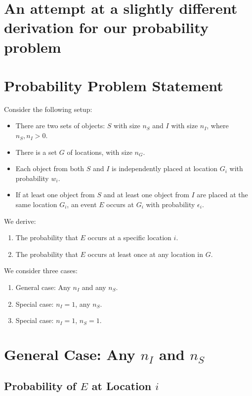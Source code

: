 \documentclass[11pt]{article}
\begin{document}
\section{An attempt at a slightly different derivation for our probability problem}

\section{Probability Problem Statement}

Consider the following setup:
\begin{itemize}
    \item There are two sets of objects: $ S $ with size $ n_S $ and $ I $ with size $ n_I $, where $ n_S, n_I > 0 $.
    \item There is a set $ G $ of locations, with size $ n_G $.
    \item Each object from both $ S $ and $ I $ is independently placed at location $ G_i $ with probability $ w_i $.
    \item If at least one object from $ S $ and at least one object from $ I $ are placed at the same location $ G_i $, an event $ E $ occurs at $ G_i $ with probability $ \epsilon_i $.
\end{itemize}

We derive:
\begin{enumerate}
    \item The probability that $ E $ occurs at a specific location $ i $.
    \item The probability that $ E $ occurs at least once at any location in $ G $.
\end{enumerate}

We consider three cases:
\begin{enumerate}
    \item General case: Any $ n_I $ and any $ n_S $.
    \item Special case: $ n_I = 1 $, any $ n_S $.
    \item Special case: $ n_I = 1 $, $ n_S = 1 $.
\end{enumerate}

\section{General Case: Any $ n_I $ and $ n_S $}

\subsection{Probability of $ E $ at Location $ i $}
\end{document}
